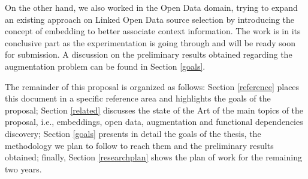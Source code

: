 On the other hand, we also worked in the Open Data domain, trying to expand an existing approach on Linked Open Data source selection \cite{beyza2019linked} by introducing the concept of embedding to better associate context information. The work is in its conclusive part as the experimentation is going through and will be ready soon for submission. A discussion on the preliminary results obtained regarding the augmentation problem can be found in Section \ref{goals}.

The remainder of this proposal is organized as follows: Section \ref{reference} places this document in a specific reference area and highlights the goals of the proposal; Section \ref{related} discusses the state of the Art of the main topics of the proposal, i.e., embeddings, open data, augmentation and functional dependencies discovery; Section \ref{goals} presents in detail the goals of the thesis, the methodology we plan to follow to reach them and the preliminary results obtained; finally, Section \ref{researchplan} shows the plan of work for the remaining two years. 
\bigbreak 


